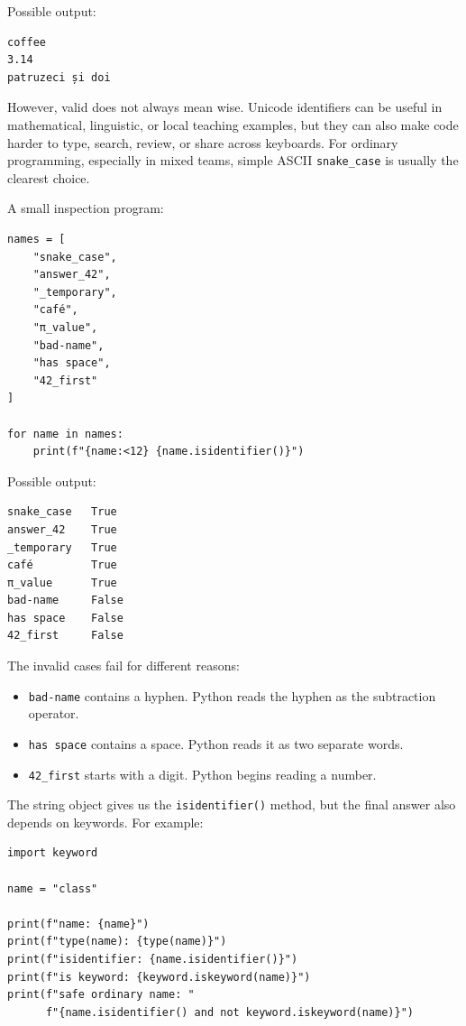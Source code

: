 Possible output:

\begin{verbatim}
coffee
3.14
patruzeci și doi
\end{verbatim}

However, valid does not always mean wise. Unicode identifiers can be useful in mathematical, linguistic, or local teaching examples, but they can also make code harder to type, search, review, or share across keyboards. For ordinary programming, especially in mixed teams, simple ASCII \texttt{snake\_case} is usually the clearest choice.

A small inspection program:

\begin{verbatim}
names = [
    "snake_case",
    "answer_42",
    "_temporary",
    "café",
    "π_value",
    "bad-name",
    "has space",
    "42_first"
]

for name in names:
    print(f"{name:<12} {name.isidentifier()}")
\end{verbatim}

Possible output:

\begin{verbatim}
snake_case   True
answer_42    True
_temporary   True
café         True
π_value      True
bad-name     False
has space    False
42_first     False
\end{verbatim}

The invalid cases fail for different reasons:

\begin{itemize}
    \item \texttt{bad-name} contains a hyphen. Python reads the hyphen as the subtraction operator.
    \item \texttt{has space} contains a space. Python reads it as two separate words.
    \item \texttt{42\_first} starts with a digit. Python begins reading a number.
\end{itemize}

The string object gives us the \texttt{isidentifier()} method, but the final answer also depends on keywords. For example:

\begin{verbatim}
import keyword

name = "class"

print(f"name: {name}")
print(f"type(name): {type(name)}")
print(f"isidentifier: {name.isidentifier()}")
print(f"is keyword: {keyword.iskeyword(name)}")
print(f"safe ordinary name: "
      f"{name.isidentifier() and not keyword.iskeyword(name)}")
\end{verbatim}


